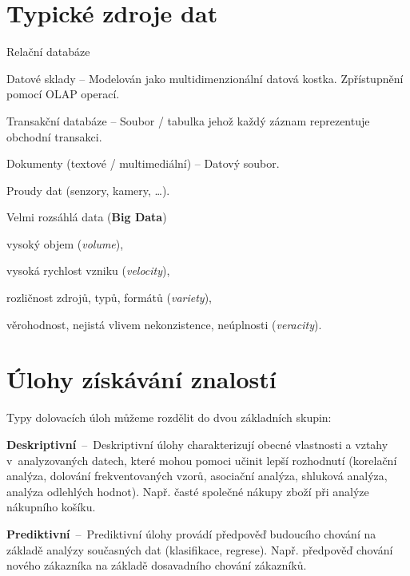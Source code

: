 
\section{Typické zdroje dat}

\begin{compactitem}
    \item Relační databáze
    \item Datové sklady -- Modelován jako multidimenzionální datová kostka. Zpřístupnění pomocí OLAP operací.
    \item Transakční databáze -- Soubor / tabulka jehož každý záznam reprezentuje obchodní transakci.
    \item Dokumenty (textové / multimediální) -- Datový soubor.
    \item Proudy dat (senzory, kamery, \dots).
    \item Velmi rozsáhlá data (\textbf{Big Data}) \begin{compactitem}
        \item vysoký objem (\textit{volume}),
        \item vysoká rychlost vzniku (\textit{velocity}),
        \item rozličnost zdrojů, typů, formátů (\textit{variety}),
        \item věrohodnost, nejistá vlivem nekonzistence, neúplnosti (\textit{veracity}).
    \end{compactitem}
\end{compactitem}


\section{Úlohy získávání znalostí}

\begin{compactitem}
    \item Typy dolovacích úloh můžeme rozdělit do dvou základních skupin:

    \begin{compactitem}
        \item \textbf{Deskriptivní}~--~Deskriptivní úlohy charakterizují obecné vlastnosti a vztahy v~analyzovaných datech, které mohou pomoci učinit lepší rozhodnutí (korelační analýza, dolování frekventovaných vzorů, asociační analýza, shluková analýza, analýza odlehlých hodnot). Např. časté společné nákupy zboží při analýze nákupního košíku.

        \item \textbf{Prediktivní}~--~Prediktivní úlohy provádí předpověď budoucího chování na základě analýzy současných dat (klasifikace, regrese). Např. předpověď chování nového zákazníka na základě dosavadního chování zákazníků.
    \end{compactitem}
\end{compactitem}


